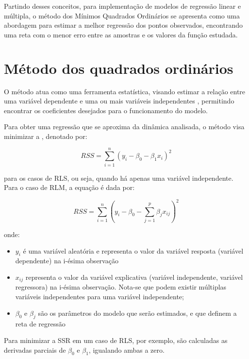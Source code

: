 Partindo desses conceitos, para implementação de modelos de regressão linear e múltipla, o método dos Mínimos Quadrados Ordinários se apresenta como uma abordagem para estimar a melhor regressão dos pontos observados, encontrando uma reta com o menor erro entre as amostras e os valores da função estudada.

\section{Método dos quadrados ordinários}

O método  atua como uma ferramenta estatística, visando estimar a relação entre uma variável dependente e uma ou mais variáveis independentes \cite{Alkama2020}, permitindo encontrar os coeficientes desejados para o funcionamento do modelo.

Para obter uma regressão que se aproxima da dinâmica analisada, o método visa minimizar a , denotado por:

\begin{equation}
	RSS = \sum_{i=1}^{n} \left(y_i - \beta_0 - \beta_1x_{i}\right)^2
\end{equation}

para os casos de \gls{RLS}, ou seja, quando há apenas uma variável independente. Para o caso de \gls{RLM}, a equação é dada por:

\begin{equation}
    RSS = \sum_{i=1}^{n} \left(y_i - \beta_0 - \sum_{j=1}^{p}\beta_jx_{ij}\right)^2
\end{equation}

onde:

\begin{itemize}
    \item $y_i$ é uma variável aleatória e representa o valor da variável resposta (variável dependente) na i-ésima observação
    \item $x_{ij}$ representa o valor da variável explicativa (variável independente, variável regressora) na i-ésima observação. Nota-se que podem existir múltiplas variáveis independentes para uma variável independente; 
    \item $\beta_{0}$ e $\beta_{j}$ são os parâmetros do modelo que serão estimados, e que definem a reta de regressão
\end{itemize}

Para minimizar a SSR em um caso de RLS, por exemplo, são calculadas as derivadas parciais de $\beta_0$ e $\beta_1$, igualando ambas a zero.


